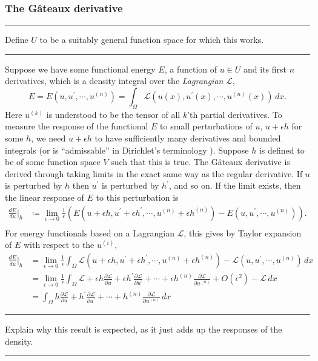 \documentclass{article}
\newcommand{\pr}{\prime}
\newcommand{\fancyL}{\mathcal{L}}
\newcommand{\todo}[1]{\vskip 0.1in \hrule \vskip 0.03in {#1} \vskip 0.03in \hrule \vskip 0.1in}
\begin{document}
\subsubsection{The G\^ateaux derivative}
\todo{Define $U$ to be a suitably general function space for which this works.}

Suppose we have some functional energy $E$, a function of $u \in U$ and its first $n$ derivatives,
which is a density integral over the \textit{Lagrangian} $\fancyL$,
    $$E = E(u, u^\prime, \cdots, u^{(n)}) = \int_\Omega \fancyL(u(x),u^\prime(x),\cdots,u^{(n)}(x))\,dx.$$
Here $u^{(k)}$ is understood to be the tensor of all $k$'th partial derivatives. To measure
the response of the functional $E$ to small perturbations of $u$, $u + \epsilon h$ for some $h$, we need $u + \epsilon h$ to
have sufficiently many derivatives and bounded integrals (or is ``admissable'' in Dirichlet's terminology \cite{dirichlet_principle}). Suppose $h$ is defined to be of some function space $V$ such that
this is true.
The G\^ateaux derivative is derived through taking limits in the exact same way as the regular derivative.
If $u$ is perturbed by $h$ then $u^\prime$ is perturbed by $h^\prime$, and so on. If the limit exists, then the
linear response of $E$ to this perturbation is
\begin{align*}
    \frac{dE}{du}\Big|_h &\coloneqq \lim_{\epsilon \rightarrow 0} \frac{1}{\epsilon} \left(E(u + \epsilon h, u^\prime + \epsilon h^\pr, \cdots, u^{(n)} + \epsilon h^{(n)})
        - E(u, u^\pr, \cdots, u^{(n)})\right).\\
\end{align*}
For energy functionals based on a Lagrangian $\fancyL$, this gives by Taylor expansion of $E$ with respect to the $u^{(i)}$,
\begin{equation}\label{gateaux_lagrangian}
\begin{split}
    \frac{dE}{du}\Big|_h &=
        \lim_{\epsilon \rightarrow 0} \frac{1}{\epsilon} \int_\Omega \mathcal{L}(u +\epsilon h, u^\pr + \epsilon h^\pr,\cdots, u^{(n)} + \epsilon h^{(n)})
            - \mathcal{L}(u, u^\pr,\cdots, u^{(n)})\, dx \\
        &= \lim_{\epsilon \rightarrow 0} \frac{1}{\epsilon}
                \int_\Omega \mathcal{L}
                    + \epsilon h\frac{\partial\mathcal{L}}{\partial u}
                    + \epsilon h^\pr\frac{\partial\mathcal{L}}{\partial u^\pr}
                    +\cdots
                    + \epsilon h^{(n)}\frac{\partial\mathcal{L}}{\partial u^{(n)}} + O(\epsilon^2)
                    - \mathcal{L}\,dx\\
        &= \int_\Omega h\frac{\partial\mathcal{L}}{\partial u} + h^\prime\frac{\partial\fancyL}{\partial u^\prime} + \cdots + h^{(n)}\frac{\partial\fancyL}{\partial u^{(n)}}\,dx
\end{split}
\end{equation}
\todo{Explain why this result is expected, as it just adds up the responses of the density.}
\end{document}
